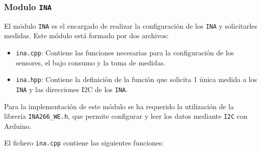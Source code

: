 \subsubsection{Modulo \texttt{INA}}

El módulo \texttt{INA} es el encargado de realizar la configuración de los \texttt{INA} y solicitarles medidas.
Este módulo está formado por dos archivos:
\begin{itemize}
    \item \texttt{ina.cpp}: Contiene las funciones necesarias para la configuración de los sensores, el bajo consumo y la toma de medidas.
    \item \texttt{ina.hpp}: Contiene la definición de la función que solicita 1 única medida a los \texttt{INA} y las direcciones I2C de los \texttt{INA}.
\end{itemize}

Para la implementación de este módulo se ha requerido la utilización de la librería \texttt{INA266\_WE.h}, que permite configurar y leer los datos mediante \texttt{I2C} con Arduino. \cite{ewaldWollewaldINA226_WE2024}

El fichero \texttt{ina.cpp} contiene las siguientes funciones:

